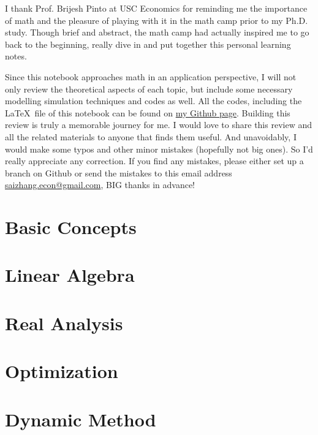 \documentclass[12pt,openany]{report}
\begin{document}
I thank Prof. Brijesh Pinto at USC Economics for reminding me the importance of math and the pleasure of 
playing with it in the math camp prior to my Ph.D. study. Though brief and abstract, the math camp had actually inspired
me to go back to the beginning, really dive in and put together this personal learning notes.

Since this notebook approaches math in an application perspective, I will not only
review the theoretical aspects of each topic, but include some necessary modelling simulation techniques
and codes as well. All the codes, including the \LaTeX \ file of this notebook can be found on \href{https://github.com/SaiChrisZHANG}{my Github page}. 
Building this review is truly a memorable journey for me. I would love to share this review and all the related
materials to anyone that finds them useful. And unavoidably, I would make some
typos and other minor mistakes (hopefully not big ones). So I'd really appreciate
any correction. If you find any mistakes, please either set up a branch on Github
or send the mistakes to this email address \href{mailto:saizhang.econ@gmail.com}{saizhang.econ@gmail.com}, BIG thanks in advance!

\newpage

\dominitoc
{}
\label{ToC-first-page}
\tableofcontents

\pagestyle{mystyle}
\chapter{Basic Concepts}


\chapter{Linear Algebra}

\chapter{Real Analysis}

\chapter{Optimization}

\chapter{Dynamic Method}

\newpage


\end{document}
